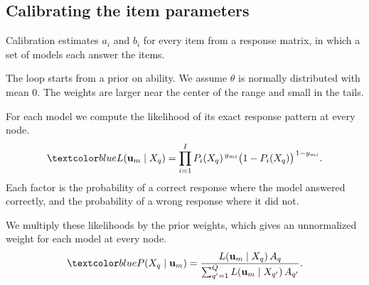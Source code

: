 \subsection{Calibrating the item parameters}

Calibration estimates $a_i$ and $b_i$ for every item from a response matrix, in
which a set of models each answer the items. 

The loop starts from a prior on ability. We assume $\theta$ is normally
distributed with mean $0$.  The weights are larger near the center of the
range and small in the tails. 

For each model we compute the likelihood of its exact response pattern at every
node. 
\begin{equation}
  \aiadd{L(\mathbf{u}_m \mid X_q)
  = \prod_{i=1}^{I} P_i(X_q)^{\,y_{mi}}
    \big(1 - P_i(X_q)\big)^{\,1 - y_{mi}} .}
  \label{eq:pattern-likelihood}
\end{equation}
Each factor is the probability of a correct response where the model answered
correctly, and the probability of a wrong response where it did not.

We multiply these likelihoods by the prior weights, which gives an unnormalized
weight for each model at every node. 
\begin{equation}
  \aiadd{P(X_q \mid \mathbf{u}_m)
  = \frac{L(\mathbf{u}_m \mid X_q)\, A_q}
         {\sum_{q'=1}^{Q} L(\mathbf{u}_m \mid X_{q'})\, A_{q'}} .}
  \label{eq:estep-posterior}
\end{equation}

